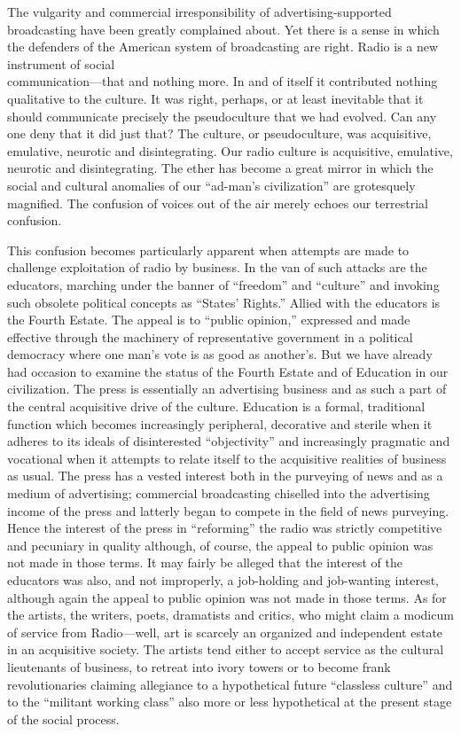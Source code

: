 \documentclass[openany,nobib]{tufte-book}
\begin{document}
The vulgarity and commercial irresponsibility of advertising-supported
broadcasting have been greatly complained about. Yet there is a sense in
which the defenders of the American system of broadcasting are right.
Radio is a new instrument of social\\ \noindent communication---that and nothing
more. In and of itself it contributed nothing qualitative to the
culture. It was right, perhaps, or at least inevitable that it should
communicate precisely the pseudoculture that we had evolved. Can any one
deny that it did just that? The culture, or pseudoculture, was
acquisitive, emulative, neurotic and disintegrating. Our radio culture
is acquisitive, emulative, neurotic and disintegrating. The ether has
become a great mirror in which the social and cultural anomalies of our
``ad-man's civilization'' are grotesquely magnified. The confusion of
voices out of the air merely echoes our terrestrial confusion.

This confusion becomes particularly apparent when attempts are made to
challenge exploitation of radio by business. In the van of such attacks
are the educators, marching under the banner of ``freedom'' and
``culture'' and invoking such obsolete political concepts as ``States'
Rights.'' Allied with the educators is the Fourth Estate. The appeal is
to ``public opinion,'' expressed and made effective through the
machinery of representative government in a political democracy where
one man's vote is as good as another's. But we have already had occasion
to examine the status of the Fourth Estate and of Education in our
civilization. The press is essentially an advertising business and as
such a part of the central acquisitive drive of the culture. Education
is a formal, traditional function which becomes increasingly peripheral,
decorative and sterile when it adheres to its ideals of disinterested
``objectivity'' and increasingly pragmatic and vocational when it
attempts to relate itself to the acquisitive realities of business as
usual. The press has a vested interest both in the purveying of news and
as a medium of advertising; commercial broadcasting chiselled into the
advertising income of the press and latterly began to compete in the
field of news purveying. Hence the interest of the press in
``reforming'' the radio was strictly competitive and pecuniary in
quality although, of course, the appeal to public opinion was not made
in those terms. It may fairly be alleged that the interest of the
educators was also, and not improperly, a job-holding and job-wanting
interest, although again the appeal to public opinion was not made in
those terms. As for the artists, the writers, poets, dramatists and
critics, who might claim a modicum of service from Radio---well, art is
scarcely an organized and independent estate in an acquisitive society.
The artists tend either to accept service as the cultural lieutenants of
business, to retreat into ivory towers or to become frank
revolutionaries claiming allegiance to a hypothetical future ``classless
culture'' and to the ``militant working class'' also more or less
hypothetical at the present stage of the social process.
\end{document}
